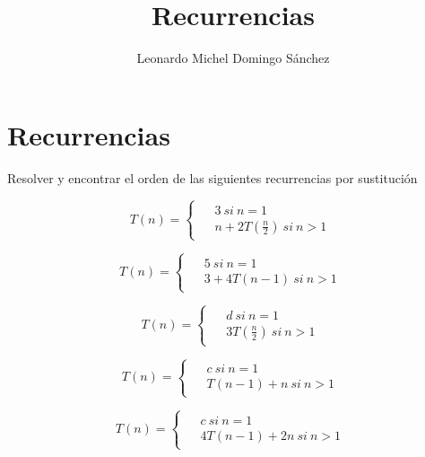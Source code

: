 \documentclass[11pt,letterpaper,fleqn]{article}
\title{Recurrencias}
\author{Leonardo Michel Domingo Sánchez}
\begin{document}
\maketitle
\tableofcontents
\break

\section{Recurrencias}
Resolver y encontrar el orden de las siguientes recurrencias por sustitución

\begin{equation}
	T(n) =
	\begin{cases}
		\begin{aligned}
			&3 \ si \ n = 1\\
			&n + 2T(\frac{n}{2}) \ si \ n > 1
		\end{aligned}
	\end{cases}
\end{equation}

\begin{equation}
	T(n) =
	\begin{cases}
		\begin{aligned}
			&5 \ si \ n = 1\\
			&3 + 4T(n-1) \ si \ n > 1
		\end{aligned}
	\end{cases}
\end{equation}

\begin{equation}
	T(n) =
	\begin{cases}
		\begin{aligned}
			&d \ si \ n = 1\\
			&3T(\frac{n}{2}) \ si \ n > 1
		\end{aligned}
	\end{cases}
\end{equation}

\begin{equation}
	T(n) =
	\begin{cases}
		\begin{aligned}
			&c \ si \ n = 1\\
			&T(n-1)+n \ si \ n > 1
		\end{aligned}
	\end{cases}
\end{equation}

\begin{equation}
	T(n) =
	\begin{cases}
		\begin{aligned}
			&c \ si \ n = 1\\
			&4T(n-1)+2n \ si \ n > 1
		\end{aligned}
	\end{cases}
\end{equation}
\end{document}
